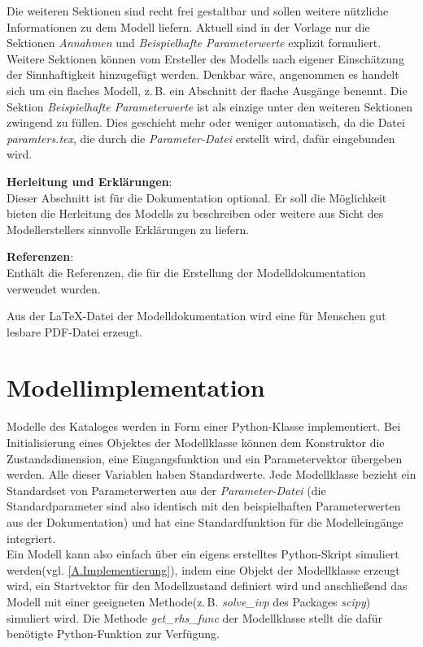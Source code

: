 Die weiteren Sektionen sind recht frei gestaltbar und sollen weitere nützliche Informationen zu dem Modell liefern. Aktuell sind in der Vorlage nur die Sektionen \textit{Annahmen} und \textit{Beispielhafte Parameterwerte} explizit formuliert. Weitere Sektionen können vom Ersteller des Modells nach eigener Einschätzung der Sinnhaftigkeit hinzugefügt werden. Denkbar wäre, angenommen es handelt sich um ein flaches Modell, z.\,B. ein Abschnitt der flache Ausgänge benennt. Die Sektion \textit{Beispielhafte Parameterwerte} ist als einzige unter den weiteren Sektionen zwingend zu füllen. Dies geschieht mehr oder weniger automatisch, da die Datei \textit{paramters.tex}, die durch die \textit{Parameter-Datei} erstellt wird, dafür eingebunden wird.

\textbf{Herleitung und Erklärungen}:\\
Dieser Abschnitt ist für die Dokumentation optional. Er soll die Möglichkeit bieten die Herleitung des Modells zu beschreiben oder weitere aus Sicht des Modellerstellers sinnvolle Erklärungen zu liefern.

\textbf{Referenzen}:\\
Enthält die Referenzen, die für die Erstellung der Modelldokumentation verwendet wurden.

Aus der \LaTeX-Datei der Modelldokumentation wird eine für Menschen gut lesbare PDF-Datei erzeugt. 

\section{Modellimplementation}
\label{Ch:Ergebnisse:Sec:Implementation}
Modelle des Kataloges werden in Form einer Python-Klasse implementiert. Bei Initialisierung eines Objektes der Modellklasse können dem Konstruktor die Zustandsdimension, eine Eingangsfunktion und ein Parametervektor übergeben werden. Alle dieser Variablen haben Standardwerte. Jede Modellklasse bezieht ein Standardset von Parameterwerten aus der \textit{Parameter-Datei} (die Standardparameter sind also identisch mit den beispielhaften Parameterwerten aus der Dokumentation) und hat eine Standardfunktion für die Modelleingänge integriert.\\ 
Ein Modell kann also einfach über ein eigens erstelltes Python-Skript simuliert werden(vgl. \ref{A.Implementierung}), indem eine Objekt der Modellklasse erzeugt wird, ein Startvektor für den Modellzustand definiert wird und anschließend das Modell mit einer geeigneten Methode(z.\,B. \textit{solve\_ivp} des Packages \textit{scipy}) simuliert wird. Die Methode \textit{get\_rhs\_func} der Modellklasse stellt die dafür benötigte Python-Funktion zur Verfügung.

